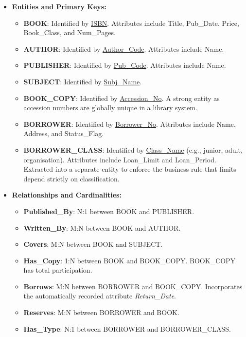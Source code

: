 \documentclass[12pt,a3paper]{article}
\begin{document}
\begin{enumerate}
\begin{tcolorbox}[enhanced,breakable,ansbox,colback=cA!4,colframe=cA,boxrule=0.8pt,arc=5pt,title={\textbf{Answer}},fonttitle=\bfseries\color{white},colbacktitle=cA]
\begin{itemize}[leftmargin=2em, itemsep=0.5em]
    \item \textbf{Entities and Primary Keys:}
    \begin{itemize}[label={--}, itemsep=2pt]
        \item \textbf{BOOK}: Identified by \underline{ISBN}. Attributes include Title, Pub\_Date, Price, Book\_Class, and Num\_Pages.
        \item \textbf{AUTHOR}: Identified by \underline{Author\_Code}. Attributes include Name.
        \item \textbf{PUBLISHER}: Identified by \underline{Pub\_Code}. Attributes include Name.
        \item \textbf{SUBJECT}: Identified by \underline{Subj\_Name}. 
        \item \textbf{BOOK\_COPY}: Identified by \underline{Accession\_No}. A strong entity as accession numbers are globally unique in a library system.
        \item \textbf{BORROWER}: Identified by \underline{Borrower\_No}. Attributes include Name, Address, and Status\_Flag.
        \item \textbf{BORROWER\_CLASS}: Identified by \underline{Class\_Name} (e.g., junior, adult, organisation). Attributes include Loan\_Limit and Loan\_Period. Extracted into a separate entity to enforce the business rule that limits depend strictly on classification.
    \end{itemize}

    \item \textbf{Relationships and Cardinalities:}
    \begin{itemize}[label={--}, itemsep=2pt]
        \item \textbf{Published\_By}: N:1 between BOOK and PUBLISHER.
        \item \textbf{Written\_By}: M:N between BOOK and AUTHOR.
        \item \textbf{Covers}: M:N between BOOK and SUBJECT.
        \item \textbf{Has\_Copy}: 1:N between BOOK and BOOK\_COPY. BOOK\_COPY has total participation.
        \item \textbf{Borrows}: M:N between BORROWER and BOOK\_COPY. Incorporates the automatically recorded attribute \textit{Return\_Date}.
        \item \textbf{Reserves}: M:N between BORROWER and BOOK.
        \item \textbf{Has\_Type}: N:1 between BORROWER and BORROWER\_CLASS.
    \end{itemize}
\end{itemize}


\end{tcolorbox}
\end{enumerate}
\end{document}
